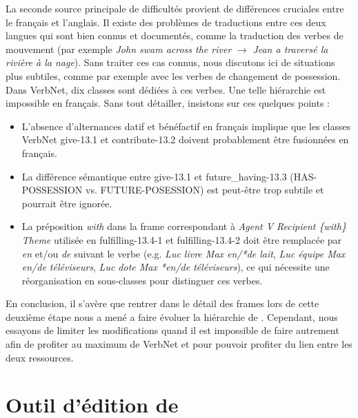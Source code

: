 La seconde source principale de difficultés provient de différences cruciales
entre le français et l'anglais. Il existe des problèmes de traductions entre
ces deux langues qui sont bien connus et documentés, comme la traduction des
verbes de mouvement (par exemple \emph{John swam across the river}
$\rightarrow$ \emph{Jean a traversé la rivière à la nage}). Sans traiter ces
cas connus, nous discutons ici de situations plus subtiles, comme par exemple
avec les verbes de changement de possession. Dans VerbNet, dix classes sont
dédiées à ces verbes. Une telle hiérarchie est impossible en français. Sans
tout détailler, insistons sur ces quelques points :

\begin{itemize}

    \item L'absence d'alternances datif et bénéfactif en français implique que
        les classes VerbNet {\color{blue}give-13.1} et
        {\color{blue}contribute-13.2} doivent probablement être fusionnées en
        français.

    \item La différence sémantique entre {\color{blue}give-13.1} et
        {\color{blue}future\_having-13.3} (HAS-POSSESSION vs. FUTURE-POSESSION)
        est peut-être trop subtile et pourrait être ignorée.

    \item La préposition \emph{with} dans la frame correspondant à \emph{Agent
        V Recipient \{with\} Theme} utilisée en {\color{blue}fulfilling-13.4-1}
        et {\color{blue}fulfilling-13.4-2} doit être remplacée par \emph{en}
        et/ou \emph{de} suivant le verbe (e.g. \emph{Luc livre Max en/*de
        lait}, \emph{Luc équipe Max en/de téléviseurs}, \emph{Luc dote Max
        *en/de téléviseurs}), ce qui nécessite une réorganisation en
        sous-classes pour distinguer ces verbes.

\end{itemize}

En conclusion, il s'avère que rentrer dans le détail des frames lors de cette
deuxième étape nous a mené a faire évoluer la hiérarchie de \verbenet{}.
Cependant, nous essayons de limiter les modifications quand il est impossible
de faire autrement afin de profiter au maximum de VerbNet et pour pouvoir
profiter du lien entre les deux ressources.

\section{Outil d'édition de \verbenet{}}\label{toolquentin}

